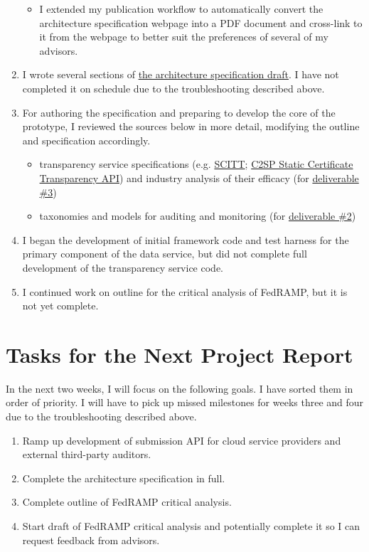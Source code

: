 \documentclass{jdf}
\begin{document}
\begin{enumerate}
\begin{itemize}
            \item I extended my publication workflow to automatically convert the architecture specification webpage into a PDF document and cross-link to it from the webpage to better suit the preferences of several of my advisors.
        \end{itemize}
    \item I wrote several sections of \hyperlink{https://add-architecture-draft--conmotion.netlify.app/architecture.html}{the architecture specification draft}. I have not completed it on schedule due to the troubleshooting described above.
    \item For authoring the specification and preparing to develop the core of the prototype, I reviewed the sources below in more detail, modifying the outline and specification accordingly.
        \begin{itemize}
            \item transparency service specifications (e.g. \hyperlink{https://datatracker.ietf.org/doc/draft-ietf-scitt-architecture/}{SCITT}; \hyperlink{https://c2sp.org/static-ct-api}{C2SP Static Certificate Transparency API}) and industry analysis of their efficacy (for  \hyperlink{https://github.com/aj-stein/practicum_proposal/blob/main/paper.pdf}{deliverable \#3})
            \item taxonomies and models for auditing and monitoring (for  \hyperlink{https://github.com/aj-stein/practicum_proposal/blob/main/paper.pdf}{deliverable \#2})
        \end{itemize}
    \item I began the development of initial framework code and test harness for the primary component of the data service, but did not complete full development of the transparency service code.
    \item I continued work on outline for the critical analysis of FedRAMP, but it is not yet complete.
\end{enumerate}

\section*{Tasks for the Next Project Report}

In the next two weeks, I will focus on the following goals. I have sorted them in order of priority. I will have to pick up missed milestones for weeks three and four due to the troubleshooting described above.

\begin{enumerate}
    \item Ramp up development of submission API for cloud service providers and external third-party auditors.
    \item Complete the architecture specification in full.
    \item Complete outline of FedRAMP critical analysis.
    \item Start draft of FedRAMP critical analysis and potentially complete it so I can request feedback from advisors.
\end{enumerate}
\end{document}
